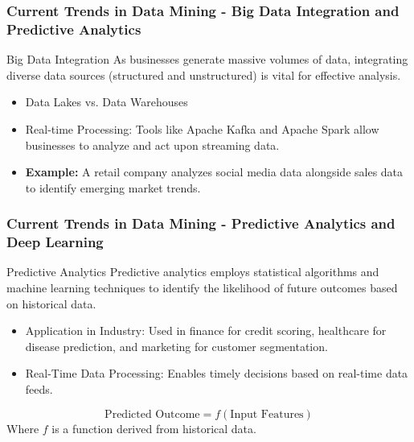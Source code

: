 \documentclass{beamer}
\begin{document}
\begin{frame}[fragile]
    \frametitle{Current Trends in Data Mining - Big Data Integration and Predictive Analytics}
    \begin{block}{Big Data Integration}
        As businesses generate massive volumes of data, integrating diverse data sources (structured and unstructured) is vital for effective analysis.
    \end{block}
    
    \begin{itemize}
        \item Data Lakes vs. Data Warehouses
        \item Real-time Processing: Tools like Apache Kafka and Apache Spark allow businesses to analyze and act upon streaming data.
        \item \textbf{Example:} A retail company analyzes social media data alongside sales data to identify emerging market trends.
    \end{itemize}
\end{frame}

\begin{frame}[fragile]
    \frametitle{Current Trends in Data Mining - Predictive Analytics and Deep Learning}
    \begin{block}{Predictive Analytics}
        Predictive analytics employs statistical algorithms and machine learning techniques to identify the likelihood of future outcomes based on historical data.
    \end{block}
    
    \begin{itemize}
        \item Application in Industry: Used in finance for credit scoring, healthcare for disease prediction, and marketing for customer segmentation.
        \item Real-Time Data Processing: Enables timely decisions based on real-time data feeds.
    \end{itemize}

    \begin{equation}
        \text{Predicted Outcome} = f(\text{Input Features}) 
    \end{equation}
    Where \( f \) is a function derived from historical data.
\end{frame}
\end{document}
